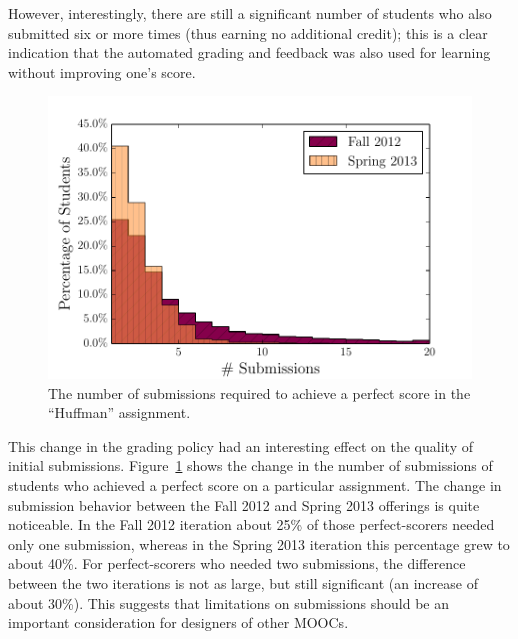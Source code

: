 \documentclass{sig-alternate}
\begin{document}
However, interestingly, there are still a significant
number of students who also submitted six or more times (thus earning no additional
credit); this is a clear indication that the automated grading and feedback
was also used for learning without improving one's score.

\begin{figure}[ht!]
  \centering
  \includegraphics[width=\columnwidth]{plots/top-scores-submissions-histogram.pdf}
  \vspace{-0.7cm}
  \caption{The number of submissions required to achieve a perfect score in the ``Huffman'' assignment.}
  \label{fig:top-scores-submissions}
\end{figure}

This change in the grading policy had an interesting effect on the quality of
initial submissions. Figure~\ref{fig:top-scores-submissions} shows the change
in the number of submissions of students who achieved a perfect score on a
particular assignment. The change in submission behavior between the Fall 2012
and Spring 2013 offerings is quite noticeable.
In the Fall 2012 iteration about 25\% of those perfect-scorers needed only one
submission, whereas in the Spring 2013 iteration this percentage grew to about
40\%. For perfect-scorers who needed two submissions, the difference between
the two iterations is not as large, but still significant (an increase of
about 30\%). This suggests that limitations on submissions should be an important consideration for designers of other MOOCs.
\end{document}
